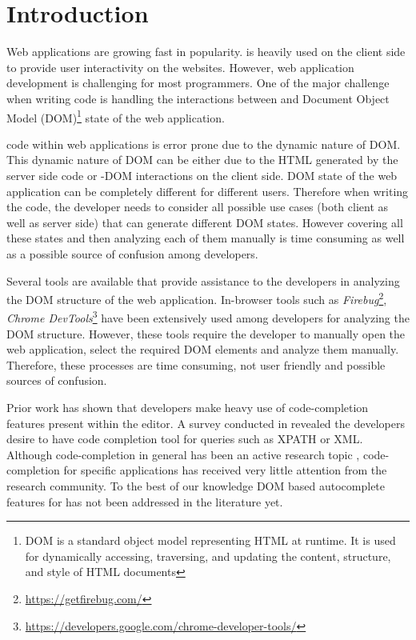 \section{Introduction}
\label{Sec:Introduction}

Web applications are growing fast in popularity. \javascript is heavily used on the client side to provide user interactivity on the websites. However, web application development is challenging for most programmers. One of the major challenge when writing \javascript code is handling the interactions between \javascript and Document Object Model (DOM)\footnote{DOM is a standard object model representing HTML at runtime. It is used for dynamically accessing, traversing, and updating the content, structure, and style of HTML documents} state of the web application.\cite{ocariza2013empirical} 


\javascript code within web applications is error prone due to the dynamic nature of DOM. This dynamic nature of DOM can be either due to the HTML generated by the server side code or \javascript-DOM interactions on the client side. DOM state of the web application can be completely different for different users. Therefore when writing the \javascript code, the developer needs to consider all possible use cases (both client as well as server side) that can generate different DOM states. However covering all these states and then analyzing each of them manually is time consuming as well as a possible source of confusion among developers. 


Several tools are available that provide assistance to the developers in analyzing the DOM structure of the web application. In-browser tools such as \emph{Firebug}\footnote{\url{https://getfirebug.com/}}, \emph{Chrome DevTools}\footnote{\url{https://developers.google.com/chrome-developer-tools/}} have been extensively used among developers for analyzing the DOM structure. However, these tools require the developer to manually open the web application, select the required DOM elements and analyze them manually. Therefore, these processes are time consuming, not user friendly and possible sources of confusion.

Prior work \cite{murphy2006java} has shown that developers make heavy use of code-completion features present within the editor. A survey conducted in \cite{omar2012active} revealed the developers desire to have code completion tool for queries such as XPATH or XML. Although code-completion in general has been an active research topic \cite{robbes2008program, lee2008towards, han2009code, bruch2009learning, brandt2010example, mooty2010calcite, hou2011evaluation}, code-completion for \javascript specific applications has received very little attention from the research community. To the best of our knowledge DOM based autocomplete features for \javascript has not been addressed in the literature yet.


